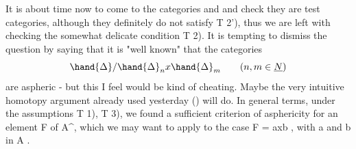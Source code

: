 It is about time now to come to the categories \hand{$\Delta$} and \hand{$\square$} and check
they are test categories, although they definitely do not satisfy T 2'),
thus we are left with checking the somewhat delicate condition T 2). It
is tempting to dismiss the question by saying that it is "well known" that
the categories
\[ \hand{\Delta} / \hand{\Delta}_n x \hand{\Delta}_m \qquad (n,m \in \underline{N} ) \]
are aspheric - but this I feel would be kind of cheating. Maybe the
very intuitive homotopy argument already used yesterday ()
will do. In general terms, under the assumptions T 1), T 3), we found
a sufficient criterion of asphericity for an element F of A\^{}, which we
may want to apply to the case F = axb , with a and b in A . 
